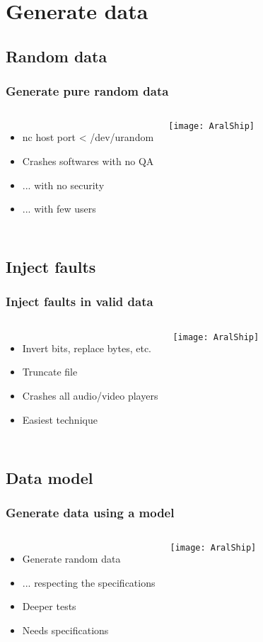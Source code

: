 \section{Generate data}

\subsection{Random data}
\frame
{
    \frametitle{Generate pure random data}
    \begin{columns}[c]
        \column{2.3in}
            \begin{itemize}
            \item nc host port < /dev/urandom
            \item Crashes softwares with no QA
            \item ... with no security
            \item ... with few users
            \end{itemize}

        \column{2.3in}
            \texttt{[image: AralShip]}
    \end{columns}
}

\subsection{Inject faults}
\frame
{
    \frametitle{Inject faults in valid data}
    \begin{columns}[c]
        \column{2.3in}
            \begin{itemize}
            \item Invert bits, replace bytes, etc.
            \item Truncate file
            \item Crashes all audio/video players
            \item Easiest technique
            \end{itemize}

        \column{2.3in}
            \texttt{[image: AralShip]}
    \end{columns}
}

\subsection{Data model}
\frame
{
    \frametitle{Generate data using a model}
    \begin{columns}[c]
        \column{2.3in}
            \begin{itemize}
            \item Generate random data
            \item ... respecting the specifications
            \item Deeper tests
            \item Needs specifications
            \end{itemize}

        \column{2.3in}
            \texttt{[image: AralShip]}
    \end{columns}
}


